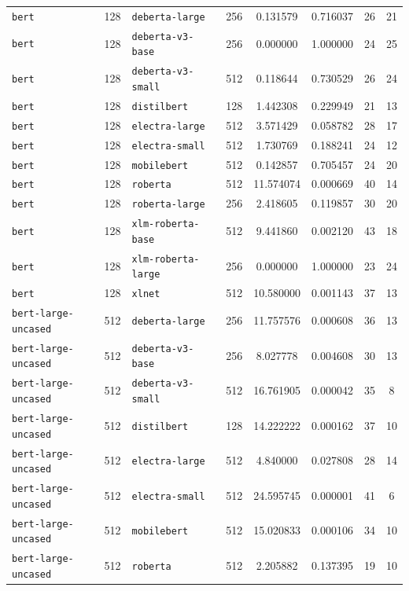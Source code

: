 \documentclass[11pt]{article}
\begin{document}
\begin{landscape}
\begin{longtable}{llllcccc}
\texttt{bert} & 128 & \texttt{deberta-large} & 256 & 0.131579 & 0.716037 & 26 & 21 \\
\texttt{bert} & 128 & \texttt{deberta-v3-base} & 256 & 0.000000 & 1.000000 & 24 & 25 \\
\texttt{bert} & 128 & \texttt{deberta-v3-small} & 512 & 0.118644 & 0.730529 & 26 & 24 \\
\texttt{bert} & 128 & \texttt{distilbert} & 128 & 1.442308 & 0.229949 & 21 & 13 \\
\texttt{bert} & 128 & \texttt{electra-large} & 512 & 3.571429 & 0.058782 & 28 & 17 \\
\texttt{bert} & 128 & \texttt{electra-small} & 512 & 1.730769 & 0.188241 & 24 & 12 \\
\texttt{bert} & 128 & \texttt{mobilebert} & 512 & 0.142857 & 0.705457 & 24 & 20 \\
\texttt{bert} & 128 & \texttt{roberta} & 512 & 11.574074 & 0.000669 & 40 & 14 \\
\texttt{bert} & 128 & \texttt{roberta-large} & 256 & 2.418605 & 0.119857 & 30 & 20 \\
\texttt{bert} & 128 & \texttt{xlm-roberta-base} & 512 & 9.441860 & 0.002120 & 43 & 18 \\
\texttt{bert} & 128 & \texttt{xlm-roberta-large} & 256 & 0.000000 & 1.000000 & 23 & 24 \\
\texttt{bert} & 128 & \texttt{xlnet} & 512 & 10.580000 & 0.001143 & 37 & 13 \\
\texttt{bert-large-uncased} & 512 & \texttt{deberta-large} & 256 & 11.757576 & 0.000608 & 36 & 13 \\
\texttt{bert-large-uncased} & 512 & \texttt{deberta-v3-base} & 256 & 8.027778 & 0.004608 & 30 & 13 \\
\texttt{bert-large-uncased} & 512 & \texttt{deberta-v3-small} & 512 & 16.761905 & 0.000042 & 35 & 8 \\
\texttt{bert-large-uncased} & 512 & \texttt{distilbert} & 128 & 14.222222 & 0.000162 & 37 & 10 \\
\texttt{bert-large-uncased} & 512 & \texttt{electra-large} & 512 & 4.840000 & 0.027808 & 28 & 14 \\
\texttt{bert-large-uncased} & 512 & \texttt{electra-small} & 512 & 24.595745 & 0.000001 & 41 & 6 \\
\texttt{bert-large-uncased} & 512 & \texttt{mobilebert} & 512 & 15.020833 & 0.000106 & 34 & 10 \\
\texttt{bert-large-uncased} & 512 & \texttt{roberta} & 512 & 2.205882 & 0.137395 & 19 & 10 \\

\end{longtable}
\end{landscape}
\end{document}
